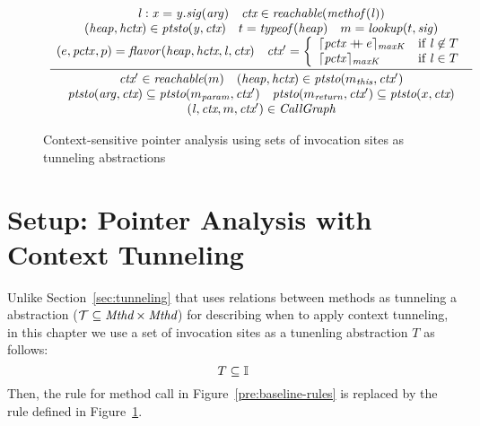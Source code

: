 \begin{figure}[t]
  \[
    \begin{array}{c}
      \infer[]
      {
      \begin{array}{c}
        \ctx' \in \Reachable ({m}) \quad
        ({\heap}, {\hctx}) \in  \VarPointsTo ({m_{\this}}, {\ctx'}) \\
        \VarPointsTo({\it arg}, \ctx) \subseteq \VarPointsTo(m_{\it param}, \ctx')
        \quad
        \VarPointsTo(m_{\it return}, \ctx') \subseteq \VarPointsTo(x, \ctx)\\
        (\invo, \ctx, m, \ctx') \in \CallGraph
      \end{array}
      }{
      \begin{array}{c}
        {\it \invo : x = y.\sig({\it arg})} \quad
        \ctx \in    \Reachable ({\methof(\invo)}) \\
        ({\heap}, {\hctx})\in  \VarPointsTo ({\it y},\ctx) \quad
        t = {\typeof}(\heap)  \quad m = {\lookup}(t, \sig) \\
(e, {\pctx}, p) = \parent(\heap,\hctx, \invo, \ctx) \quad
        \ctx' = \left\{
        \begin{array}{l@{\quad}l}
          \truncateCtx{\appendCtx{{ \pctx}}{{e}}}{\CallDepth}
          & \mbox{if}~\invo\not\in T \\
          \truncateCtx{\pctx}{\CallDepth}     & \mbox{if}~\invo                       \in T
        \end{array}
                                                          \right.
      \end{array}
                                                          }
    \end{array}
  \]
  \caption{Context-sensitive pointer analysis using sets of invocation sites as tunneling abstractions}
\label{obj2cfa:fig:tunneling-rules}
\end{figure}

\section{Setup: Pointer Analysis with Context Tunneling}\label{sec:setting}

Unlike Section~{\ref{sec:tunneling}} that uses relations between methods as tunneling a abstraction ($\mathcal{T} \subseteq \text{\it Mthd} \times \text{\it Mthd}$) for describing when to apply context tunneling, in this chapter we use a set of invocation sites as a tunenling abstraction $T$ as follows:
\[
  T \subseteq \mathbb{I}
\]
Then, the rule for method call in Figure~\ref{pre:baseline-rules} is replaced by the rule defined in Figure~\ref{obj2cfa:fig:tunneling-rules}.







